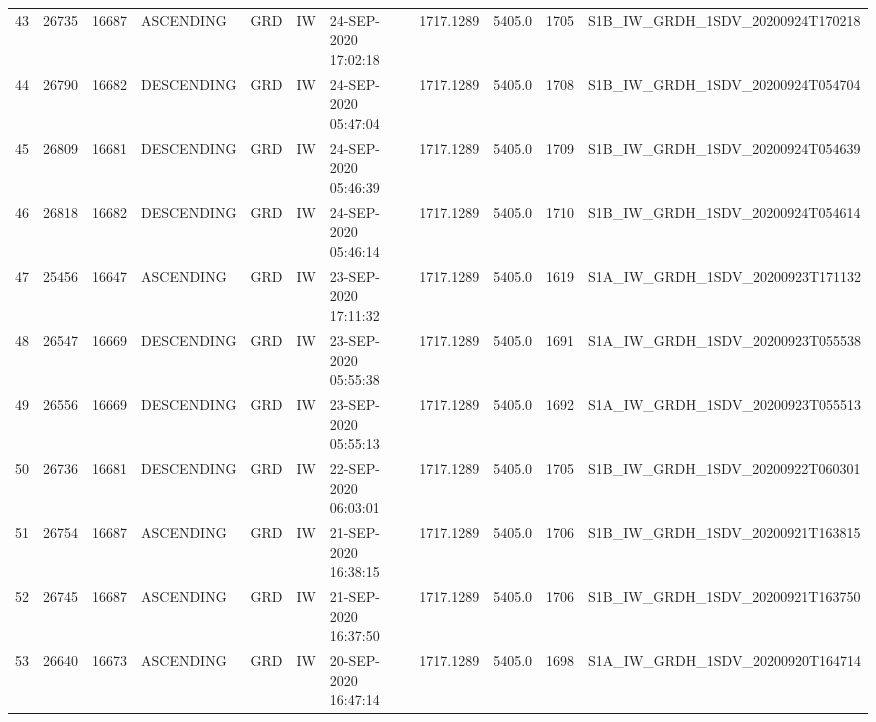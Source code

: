 \begin{tabular}{lrrllllllll}
43  &  26735 &   16687 &   ASCENDING &          GRD &              IW &  24-SEP-2020 17:02:18 &                  1717.1289 &          5405.0 &       1705 &  S1B\_IW\_GRDH\_1SDV\_20200924T170218 \\
44  &  26790 &   16682 &  DESCENDING &          GRD &              IW &  24-SEP-2020 05:47:04 &                  1717.1289 &          5405.0 &       1708 &  S1B\_IW\_GRDH\_1SDV\_20200924T054704 \\
45  &  26809 &   16681 &  DESCENDING &          GRD &              IW &  24-SEP-2020 05:46:39 &                  1717.1289 &          5405.0 &       1709 &  S1B\_IW\_GRDH\_1SDV\_20200924T054639 \\
46  &  26818 &   16682 &  DESCENDING &          GRD &              IW &  24-SEP-2020 05:46:14 &                  1717.1289 &          5405.0 &       1710 &  S1B\_IW\_GRDH\_1SDV\_20200924T054614 \\
47  &  25456 &   16647 &   ASCENDING &          GRD &              IW &  23-SEP-2020 17:11:32 &                  1717.1289 &          5405.0 &       1619 &  S1A\_IW\_GRDH\_1SDV\_20200923T171132 \\
48  &  26547 &   16669 &  DESCENDING &          GRD &              IW &  23-SEP-2020 05:55:38 &                  1717.1289 &          5405.0 &       1691 &  S1A\_IW\_GRDH\_1SDV\_20200923T055538 \\
49  &  26556 &   16669 &  DESCENDING &          GRD &              IW &  23-SEP-2020 05:55:13 &                  1717.1289 &          5405.0 &       1692 &  S1A\_IW\_GRDH\_1SDV\_20200923T055513 \\
50  &  26736 &   16681 &  DESCENDING &          GRD &              IW &  22-SEP-2020 06:03:01 &                  1717.1289 &          5405.0 &       1705 &  S1B\_IW\_GRDH\_1SDV\_20200922T060301 \\
51  &  26754 &   16687 &   ASCENDING &          GRD &              IW &  21-SEP-2020 16:38:15 &                  1717.1289 &          5405.0 &       1706 &  S1B\_IW\_GRDH\_1SDV\_20200921T163815 \\
52  &  26745 &   16687 &   ASCENDING &          GRD &              IW &  21-SEP-2020 16:37:50 &                  1717.1289 &          5405.0 &       1706 &  S1B\_IW\_GRDH\_1SDV\_20200921T163750 \\
53  &  26640 &   16673 &   ASCENDING &          GRD &              IW &  20-SEP-2020 16:47:14 &                  1717.1289 &          5405.0 &       1698 &  S1A\_IW\_GRDH\_1SDV\_20200920T164714 \\

\end{tabular}
